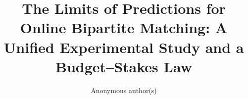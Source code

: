 \documentclass[a4paper,USenglish,anonymous]{lipics-v2021}
\title{The Limits of Predictions for Online Bipartite Matching: A Unified Experimental
  Study and a Budget--Stakes Law}
\author{Anonymous author(s)}{Anonymous affiliation}{}{}{}
\begin{document}
\maketitle

\begin{abstract}

\end{abstract}











\end{document}
